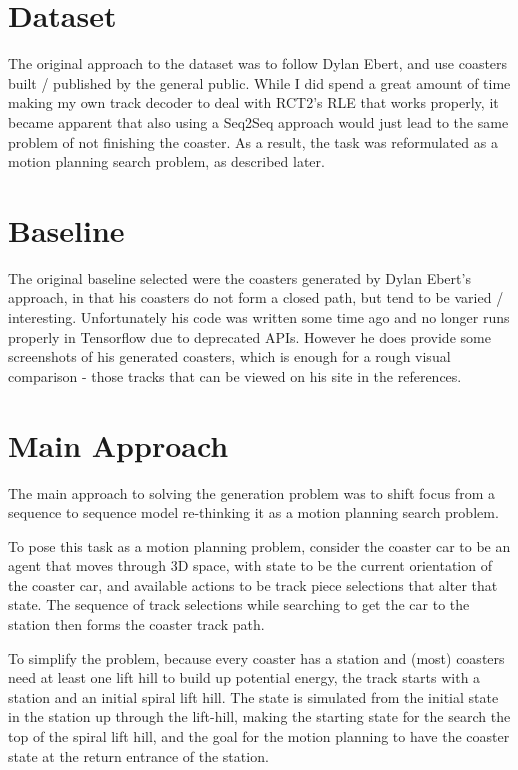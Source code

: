 \documentclass[12pt]{article}
\begin{document}
\section*{Dataset}
The original approach to the dataset was to follow Dylan Ebert, and use coasters built / published by the general public.
While I did spend a great amount of time making my own track decoder to deal with RCT2's RLE that works properly, it became apparent that also using a Seq2Seq approach would just lead to the same problem of not finishing the coaster.
As a result, the task was reformulated as a motion planning search problem, as described later.

\section*{Baseline}
The original baseline selected were the coasters generated by Dylan Ebert's approach, in that his coasters do not form a closed path, but tend to be varied / interesting.
Unfortunately his code was written some time ago and no longer runs properly in Tensorflow due to deprecated APIs.
However he does provide some screenshots of his generated coasters, which is enough for a rough visual comparison - those tracks that can be viewed on his site in the references.
\section*{Main Approach}
The main approach to solving the generation problem was to shift focus from a sequence to sequence model re-thinking it as a motion planning search problem.

To pose this task as a motion planning problem, consider the coaster car to be an agent that moves through 3D space, with state to be the current orientation of the coaster car, and available actions to be track piece selections that alter that state.
The sequence of track selections while searching to get the car to the station then forms the coaster track path.

To simplify the problem, because every coaster has a station and (most) coasters need at least one lift hill to build up potential energy, the track starts with a station and an initial spiral lift hill.
The state is simulated from the initial state in the station up through the lift-hill, making the starting state for the search the top of the spiral lift hill, and the goal for the motion planning to have the coaster state at the return entrance of the station.
\end{document}

